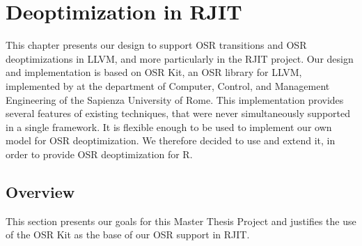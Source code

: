 
\chapter{Deoptimization in RJIT} %

\label{Chapter4} %


\newcommand{\keyword}[1]{\textit{#1}}
\newcommand{\tabhead}[1]{\textbf{#1}}
\newcommand{\code}[1]{\texttt{#1}}
\newcommand{\file}[1]{\texttt{\bfseries#1}}
\newcommand{\option}[1]{\texttt{\itshape#1}}

This chapter presents our design to support OSR transitions and OSR deoptimizations in LLVM, and more particularly in the RJIT project.
Our design and implementation is based on OSR Kit\cite{OSRKit, OSRKitGit}, an OSR library for LLVM, implemented by  at the department of Computer, Control, and Management Engineering of the Sapienza University of Rome.
This implementation provides several features of existing techniques, that were never simultaneously supported in a single framework.
It is flexible enough to be used to implement our own model for OSR deoptimization.
We therefore decided to use and extend it, in order to provide OSR deoptimization for R.\\

\section{Overview}
This section presents our goals for this Master Thesis Project and justifies the use of the OSR Kit as the base of our OSR support in RJIT.\\


